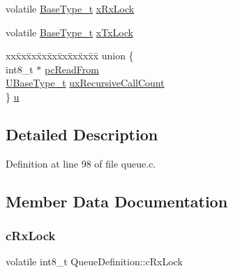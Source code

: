 \begin{DoxyCompactItemize}
\begin{tabbing}
\end{tabbing}\item 
volatile \hyperlink{externals_2freertos_2portable_2_g_c_c_2_a_r_m___c_m0_2portmacro_8h_a46fb21e00ae0729d7515c0fbf2269796}{Base\+Type\+\_\+t} \hyperlink{struct_queue_definition_acfda1aacb3043fab24087782f996dc8b}{x\+Rx\+Lock}
\item 
volatile \hyperlink{externals_2freertos_2portable_2_g_c_c_2_a_r_m___c_m0_2portmacro_8h_a46fb21e00ae0729d7515c0fbf2269796}{Base\+Type\+\_\+t} \hyperlink{struct_queue_definition_a96013417532d70900fb608f5926d8043}{x\+Tx\+Lock}
\item 
\begin{tabbing}
xx\=xx\=xx\=xx\=xx\=xx\=xx\=xx\=xx\=\kill
union \{\\
\>int8\_t $\ast$ \hyperlink{struct_queue_definition_a970cf73ab9c7382b581bc310b1d947d5}{pcReadFrom}\\
\>\hyperlink{externals_2freertos_2portable_2_g_c_c_2_a_r_m___c_m0_2portmacro_8h_a646f89d4298e4f5afd522202b11cb2e6}{UBaseType\_t} \hyperlink{struct_queue_definition_a2cf88e286477f6f89fe1009d722dc4cf}{uxRecursiveCallCount}\\
\} \hyperlink{struct_queue_definition_a517fb9c3795723e9332b88b715752617}{u}\\

\end{tabbing}\end{DoxyCompactItemize}


\subsection{Detailed Description}


Definition at line 98 of file queue.\+c.



\subsection{Member Data Documentation}
\mbox{\label{struct_queue_definition_ac750a3f75a6e174adbc697e473a0dd13}} 
\subsubsection{\texorpdfstring{c\+Rx\+Lock}{cRxLock}}
{\footnotesize\ttfamily volatile int8\+\_\+t Queue\+Definition\+::c\+Rx\+Lock}



